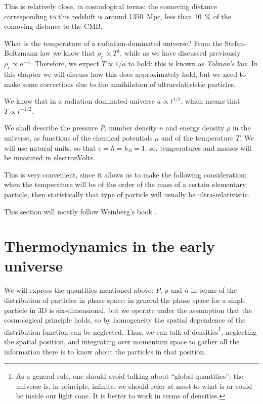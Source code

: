 \documentclass[main.tex]{subfiles}
\begin{document}
This is relatively close, in cosmological terms: the comoving distance corresponding to this redshift is around \SI{1350}{Mpc}, less than \SI{10}{\percent} of the comoving distance to the CMB. 


What is the temperature of a radiation-dominated universe?
From the Stefan-Boltzmann law we know that \(\rho _r \propto T^{4}\), while as we have discussed previously \(\rho _r \propto a^{-4}\).
Therefore, we expect \(T \propto 1/a\) to hold: this is known as \emph{Tolman's law}.
In this chapter we will discuss how this does approximately hold, but we need to make some corrections due to the annihilation of ultrarelativistic particles.

We know that in a radiation dominated universe \(a \propto t^{1/2}\), which means that \(T \propto t^{-1/2}\).

We shall describe the pressure \(P\), number density \(n\) and energy density \(\rho  \) in the universe, as functions of the chemical potentials \(\mu \) and of  the temperature \(T\).
We will use natural units, so that \(c= \hbar = k_B = 1\): so, temperatures and masses will be measured in electronVolts. 

This is very convenient, since it allows us to make the following consideration: when the temperature will be of the order of the mass of a certain elementary particle, then statistically that type of particle will usually be ultra-relativistic.

This section will mostly follow Weinberg's book \cite[page 538, section 15.6]{weinbergGravitationCosmologyPrinciples1972}.

\section{Thermodynamics in the early universe}

We will express the quantities mentioned above: \(P\), \(\rho \) and \(n\) in terms of the distribution of particles in phase space: in general the phase space for a single particle in 3D is six-dimensional, but we operate under the assumption that the cosmological principle holds, so by homogeneity the spatial dependence of the distribution function can be neglected. 
Thus, we can talk of densities\footnote{As a general rule, one should avoid talking about ``global quantities'': the universe is, in principle, infinite, we should refer at most to what is or could be inside our light cone. It is better to work in terms of densities.}, neglecting the spatial position, and integrating over momentum space to gather all the information there is to know about the particles in that position.
\end{document}
